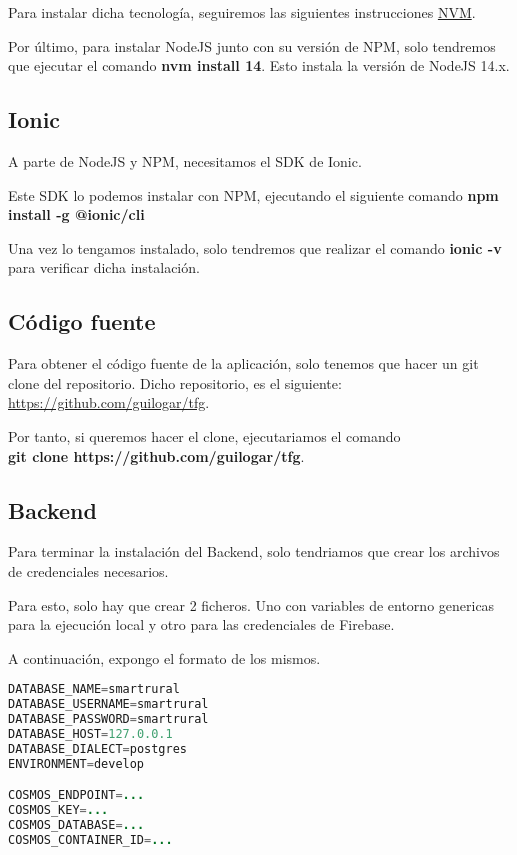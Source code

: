 Para instalar dicha tecnología, seguiremos las siguientes instrucciones \textcolor{blue}{\href{https://github.com/nvm-sh/nvm}{NVM}}.

Por último, para instalar NodeJS junto con su versión de NPM, solo tendremos que ejecutar el comando \textbf{nvm install 14}. Esto instala la versión de NodeJS 14.x.

\subsection{Ionic}
A parte de NodeJS y NPM, necesitamos el SDK de Ionic.

Este SDK lo podemos instalar con NPM, ejecutando el siguiente comando \textbf{npm install -g @ionic/cli}

Una vez lo tengamos instalado, solo tendremos que realizar el comando \textbf{ionic -v} para verificar dicha instalación.

\subsection{Código fuente}
Para obtener el código fuente de la aplicación, solo tenemos que hacer un git clone del repositorio. Dicho repositorio, es el siguiente: \textcolor{blue}{\href{https://github.com/guilogar/tfg}{https://github.com/guilogar/tfg}}.

Por tanto, si queremos hacer el clone, ejecutariamos el comando \\
\textbf{git clone https://github.com/guilogar/tfg}.

\subsection{Backend}
Para terminar la instalación del Backend, solo tendriamos que crear los archivos de credenciales necesarios.

Para esto, solo hay que crear 2 ficheros. Uno con variables de entorno genericas para la ejecución local y otro para las credenciales de Firebase.

A continuación, expongo el formato de los mismos.

\begin{lstlisting}[language=Java,caption={Fichero .env},captionpos=b]
DATABASE_NAME=smartrural
DATABASE_USERNAME=smartrural
DATABASE_PASSWORD=smartrural
DATABASE_HOST=127.0.0.1
DATABASE_DIALECT=postgres
ENVIRONMENT=develop

COSMOS_ENDPOINT=...
COSMOS_KEY=...
COSMOS_DATABASE=...
COSMOS_CONTAINER_ID=...
\end{lstlisting}


